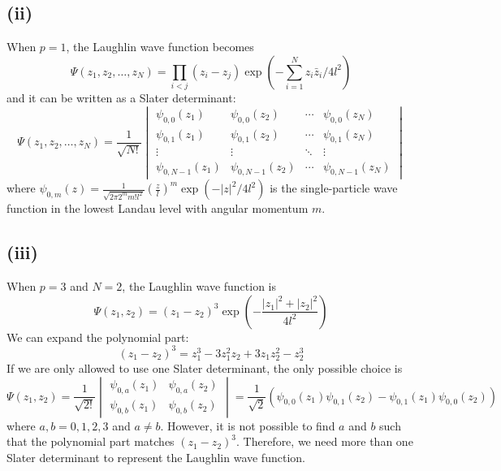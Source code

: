 \documentclass{article}
\begin{document}
\subsection*{(ii)}
When $p=1$, the Laughlin wave function becomes
\begin{equation}
    \Psi(z_1,z_2,\ldots,z_N)=\prod_{i<j}(z_i-z_j)\exp\left(-\sum_{i=1}^Nz_i \bar{z}_i/4l^2\right)
\end{equation}
and it can be written as a Slater determinant:
\begin{equation}
    \Psi(z_1,z_2,\ldots,z_N)=\frac{1}{\sqrt{N!}}\begin{vmatrix}
        \psi_{0,0}(z_1) & \psi_{0,0}(z_2) & \cdots & \psi_{0,0}(z_N)\\
        \psi_{0,1}(z_1) & \psi_{0,1}(z_2) & \cdots & \psi_{0,1}(z_N)\\
        \vdots & \vdots & \ddots & \vdots\\
        \psi_{0,N-1}(z_1) & \psi_{0,N-1}(z_2) & \cdots & \psi_{0,N-1}(z_N)
    \end{vmatrix}
\end{equation}
where $\psi_{0,m}(z)=\frac{1}{\sqrt{2\pi 2^m m! l^{2}}}\left(\frac{z}{l}\right)^m\exp(-|z|^2/4l^2)$ is the single-particle wave function in the lowest Landau level with angular momentum $m$.

\vfill

\subsection*{(iii)}
When $p=3$ and $N=2$, the Laughlin wave function is
\begin{equation}
    \Psi(z_1,z_2)=(z_1-z_2)^3\exp\left(-\frac{|z_1|^2+|z_2|^2}{4l^2}\right)
\end{equation}
We can expand the polynomial part:
\begin{equation}
    (z_1-z_2)^3=z_1^3-3z_1^2z_2+3z_1z_2^2-z_2^3
\end{equation}
If we are only allowed to use one Slater determinant, the only possible choice is
\begin{equation}
    \Psi(z_1,z_2)=\frac{1}{\sqrt{2!}}\begin{vmatrix}
        \psi_{0,a}(z_1) & \psi_{0,a}(z_2)\\
        \psi_{0,b}(z_1) & \psi_{0,b}(z_2)
    \end{vmatrix}=\frac{1}{\sqrt{2}}(\psi_{0,0}(z_1)\psi_{0,1}(z_2)-\psi_{0,1}(z_1)\psi_{0,0}(z_2))
\end{equation}
where $a,b=0,1,2,3$ and $a\neq b$.
However, it is not possible to find $a$ and $b$ such that the polynomial part matches $(z_1-z_2)^3$.
Therefore, we need more than one Slater determinant to represent the Laughlin wave function.
\end{document}
